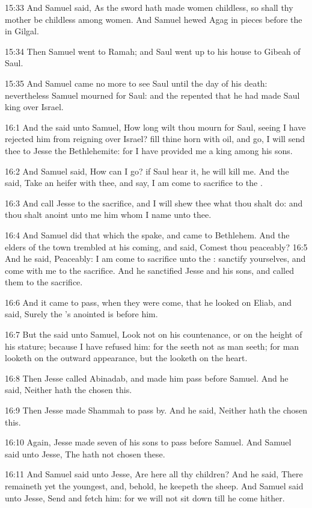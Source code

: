 15:33 And Samuel said, As the sword hath made women childless, so shall thy mother be childless among women. And Samuel hewed Agag in pieces before the \LORD in Gilgal.

15:34 Then Samuel went to Ramah; and Saul went up to his house to Gibeah of Saul.

15:35 And Samuel came no more to see Saul until the day of his death: nevertheless Samuel mourned for Saul: and the \LORD repented that he had made Saul king over Israel.

16:1 And the \LORD said unto Samuel, How long wilt thou mourn for Saul, seeing I have rejected him from reigning over Israel? fill thine horn with oil, and go, I will send thee to Jesse the Bethlehemite: for I have provided me a king among his sons.

16:2 And Samuel said, How can I go? if Saul hear it, he will kill me.  And the \LORD said, Take an heifer with thee, and say, I am come to sacrifice to the \LORD.

16:3 And call Jesse to the sacrifice, and I will shew thee what thou shalt do: and thou shalt anoint unto me him whom I name unto thee.

16:4 And Samuel did that which the \LORD spake, and came to Bethlehem.  And the elders of the town trembled at his coming, and said, Comest thou peaceably?  16:5 And he said, Peaceably: I am come to sacrifice unto the \LORD: sanctify yourselves, and come with me to the sacrifice.  And he sanctified Jesse and his sons, and called them to the sacrifice.

16:6 And it came to pass, when they were come, that he looked on Eliab, and said, Surely the \LORD's anointed is before him.

16:7 But the \LORD said unto Samuel, Look not on his countenance, or on the height of his stature; because I have refused him: for the \LORD seeth not as man seeth; for man looketh on the outward appearance, but the \LORD looketh on the heart.

16:8 Then Jesse called Abinadab, and made him pass before Samuel. And he said, Neither hath the \LORD chosen this.

16:9 Then Jesse made Shammah to pass by. And he said, Neither hath the \LORD chosen this.

16:10 Again, Jesse made seven of his sons to pass before Samuel. And Samuel said unto Jesse, The \LORD hath not chosen these.

16:11 And Samuel said unto Jesse, Are here all thy children? And he said, There remaineth yet the youngest, and, behold, he keepeth the sheep. And Samuel said unto Jesse, Send and fetch him: for we will not sit down till he come hither.

